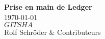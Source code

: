 
\begin{titlepage}
\vspace*{10 mm} %
\begin{center}
{\Huge\bfseries Prise en main de Ledger}\\
\vspace{50mm}
\today \leavevmode \\
$GITSHA$ \\
\vspace{\fill}
Rolf Schr\"oder \& Contributeurs
\end{center}
\end{titlepage}
\newpage
